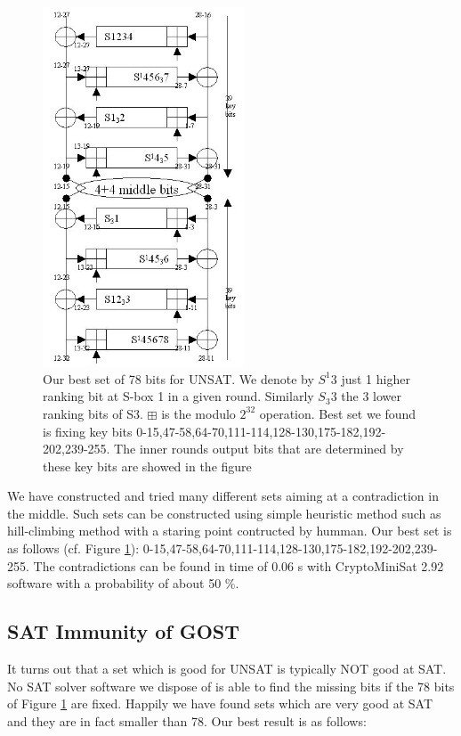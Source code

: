 \begin{figure}[h]
	\centering
	\includegraphics[width=60mm]{./pics/gost81optimal4KP.jpg}
	\caption[Our best set of 78 bits for UNSAT]{Our best set of 78 bits for UNSAT. We denote by $S^{1}3$ just 1 higher ranking bit at S-box 1 in a given round.
		Similarly $S_{3}3$ the 3 lower ranking bits of S3. $\boxplus$ is the modulo $2^{32}$ operation. Best set we found is fixing key bits 0-15,47-58,64-70,111-114,128-130,175-182,192-202,239-255. The inner rounds output bits that are determined by these key bits are showed in the figure   }
	\label{Gost81optimal4KPUNSAT78}
\end{figure}

We have constructed and tried many different sets aiming at a contradiction in the middle. Such sets can be constructed using simple heuristic method such as hill-climbing method \cite{selman2006hill} with a staring point contructed by humman. 
Our best set is as follows (cf. Figure \ref{Gost81optimal4KPUNSAT78}):
0-15,47-58,64-70,111-114,128-130,175-182,192-202,239-255.
The contradictions can be found in time of 0.06 s
with CryptoMiniSat 2.92 software \cite{CryptoMiniSat}
with a probability of about 50 $\%$.

\subsection{SAT Immunity of GOST}
It turns out that a set which is good for UNSAT is typically NOT good at SAT.
No SAT solver software we dispose of is able to find the missing bits if the 78 bits of Figure \ref{Gost81optimal4KPUNSAT78} are fixed.
Happily we have found sets which are very good at SAT and they are in fact smaller than 78.
Our best result is as follows:

